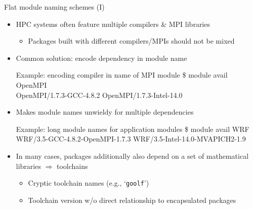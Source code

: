 \documentclass[10pt,xcolor={usenames,dvipsnames}]{beamer}
\begin{document}
\begin{frame}{Flat module naming schemes (I)}
\begin{itemize}
    \item
        HPC systems often feature multiple compilers \& MPI libraries
        \begin{itemize}
            \item
                Packages built with different compilers/MPIs should not
                be mixed
        \end{itemize}
    \item
        Common solution: encode dependency in module name\\
        \enskip
        \begin{minipage}{0.9\textwidth}
            \begin{exampleblock}{Example: encoding compiler in name of MPI module}
                \ttfamily
                \$ module avail OpenMPI\\
                OpenMPI/1.7.3-GCC-4.8.2
                    \quad OpenMPI/1.7.3-Intel-14.0
            \end{exampleblock}
        \end{minipage}
    \smallskip
    \item
        Makes module names unwieldy for multiple dependencies\\
        \enskip
        \begin{minipage}{0.9\textwidth}
            \begin{exampleblock}{Example: long module names for application modules}
                \ttfamily
                \$ module avail WRF\\
                WRF/3.5-GCC-4.8.2-OpenMPI-1.7.3
                    \quad WRF/3.5-Intel-14.0-MVAPICH2-1.9
            \end{exampleblock}
        \end{minipage}
    \smallskip
    \item
        In many cases, packages additionally also depend on a set of
        mathematical libraries $\Rightarrow$ toolchains
        \begin{itemize}
            \item
                Cryptic toolchain names (e.g., `\texttt{goolf}')
            \item
                Toolchain version w/o direct relationship to encapsulated packages
        \end{itemize}
\end{itemize}
\end{frame}
\end{document}
